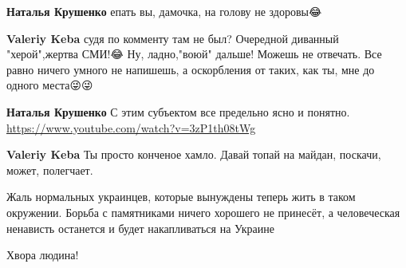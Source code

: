 \begin{itemize}
\begin{itemize}
\textbf{Наталья Крушенко} епать вы, дамочка, на голову не здоровы😂

 
\textbf{Valeriy Keba} судя по комменту там не был? Очередной диванный
"херой",жертва СМИ!😂 Ну, ладно,"воюй" дальше! Можешь не отвечать. Все равно
ничего умного не напишешь, а оскорбления от таких, как ты, мне до одного
места😜😜🤪🤪

 
\textbf{Наталья Крушенко} С этим субъектом все предельно ясно и понятно. \url{https://www.youtube.com/watch?v=3zP1th08tWg}

 
\textbf{Valeriy Keba} Ты просто конченое хамло. Давай топай на майдан, поскачи, может, полегчает.

\end{itemize}

 

Жаль нормальных украинцев, которые вынуждены теперь жить в таком окружении.
Борьба с памятниками ничего хорошего не принесёт, а человеческая ненависть
останется и будет накапливаться на Украине


 
Хвора людина!

 


\end{itemize}
